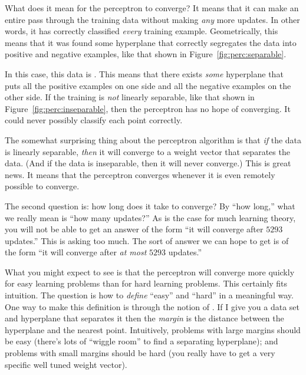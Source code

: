 
What does it mean for the perceptron to converge?  It means that it
can make an entire pass through the training data without making
\emph{any} more updates.  In other words, it has correctly classified
\emph{every} training example.  Geometrically, this means that it was
found some hyperplane that correctly segregates the data into positive
and negative examples, like that shown in
Figure~\ref{fig:perc:separable}.


In this case, this data is .  This means
that there exists \emph{some} hyperplane that puts all the positive
examples on one side and all the negative examples on the other side.
If the training is \emph{not} linearly separable, like that shown in
Figure~\ref{fig:perc:inseparable}, then the perceptron has no hope of
converging.  It could never possibly classify each point correctly.

The somewhat surprising thing about the perceptron algorithm is that
\emph{if} the data is linearly separable, \emph{then} it will converge
to a weight vector that separates the data.  (And if the data is
inseparable, then it will never converge.)  This is great news.  It
means that the perceptron converges whenever it is even remotely
possible to converge.

The second question is: how long does it take to converge?  By ``how
long,'' what we really mean is ``how many updates?''  As is the case
for much learning theory, you will not be able to get an answer of the
form ``it will converge after $5293$ updates.''  This is asking too
much.  The sort of answer we can hope to get is of the form ``it will
converge after \emph{at most} $5293$ updates.''

What you might expect to see is that the perceptron will converge more
quickly for easy learning problems than for hard learning problems.
This certainly fits intuition.  The question is how to \emph{define}
``easy'' and ``hard'' in a meaningful way.  One way to make this
definition is through the notion of .  If I give you a
data set and hyperplane that separates it%
then the \emph{margin} is the distance
between the hyperplane and the nearest point.  Intuitively, problems
with large margins should be easy (there's lots of ``wiggle room'' to
find a separating hyperplane); and problems with small margins should
be hard (you really have to get a very specific well tuned weight
vector).

